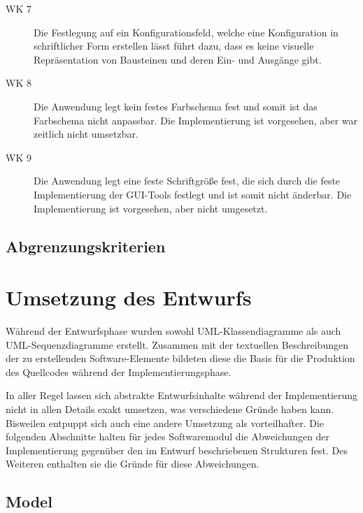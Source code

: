 \documentclass[parskip=full]{scrartcl}
\begin{document}
\begin{description}
\item[WK 7] Die Festlegung auf ein Konfigurationsfeld, welche eine Konfiguration in schriftlicher Form erstellen lässt führt dazu, dass es keine visuelle Repräsentation von Bausteinen und deren Ein- und Ausgänge gibt.
\item[WK 8] Die Anwendung legt kein festes Farbschema fest und somit ist das Farbschema nicht anpassbar. Die Implementierung ist vorgesehen, aber war zeitlich nicht umsetzbar.
\item[WK 9] Die Anwendung legt eine feste Schriftgröße fest, die sich durch die feste Implementierung der GUI-Tools festlegt und ist somit nicht änderbar. Die Implementierung ist vorgesehen, aber nicht umgesetzt.
\end{description}

\subsection{Abgrenzungskriterien}

\clearpage
\section{Umsetzung des Entwurfs}

Während der Entwurfsphase wurden sowohl UML-Klassendiagramme als auch UML-Sequenzdiagramme erstellt. Zusammen mit der textuellen Beschreibungen der zu erstellenden Software-Elemente bildeten diese die Basis für die Produktion des Quellcodes während der Implementierungsphase. 

In aller Regel lassen sich abstrakte Entwurfsinhalte während der Implementierung nicht in allen Details exakt umsetzen, was verschiedene Gründe haben kann. Bisweilen entpuppt sich auch eine andere Umsetzung als vorteilhafter. Die folgenden Abschnitte halten für jedes Softwaremodul die Abweichungen der Implementierung gegenüber den im Entwurf beschriebenen Strukturen fest. Des Weiteren enthalten sie die Gründe für diese Abweichungen. 
\clearpage

\subsection{Model}
\end{document}
